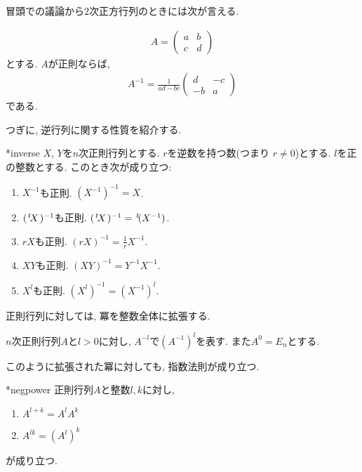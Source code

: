 冒頭での議論から$2$次正方行列のときには次が言える.
\begin{theorem}
  \begin{align*}
    A=
  \begin{pmatrix}
    a&b\\c&d
  \end{pmatrix}
  \end{align*}
  とする.  $A$が正則ならば,
  \begin{align*}
    A^{-1}=
    \frac{1}{ad-bc}
    \begin{pmatrix}
      d&-c\\-b&a
    \end{pmatrix}
  \end{align*}
  である.
\end{theorem}

つぎに,
逆行列に関する性質を紹介する.
\begin{proposition}
  \provelater**{inverse}
  \label{thm:inverse:operation}
  $X$, $Y$を$n$次正則行列とする.
  $r$を逆数を持つ数(つまり $r\neq 0$)とする.
  $l$を正の整数とする.
  このとき次が成り立つ:
  \begin{enumerate}
  \item{}
    $X^{-1}$も正則. $(X^{-1})^{-1}=X$.
  \item{}
    $({\left.^{t}\!X\right.})^{-1}$も正則. $({\left.^{t}\!X\right.})^{-1}={\left.^{t}\!(X^{-1})\right.}$.
  \item{}
    $rX$も正則. $(rX)^{-1}=\frac{1}{r}X^{-1}$.
  \item{}
    $XY$も正則. $(XY)^{-1}=Y^{-1}X^{-1}$.
  \item{}
    $X^l$も正則. $(X^l)^{-1}=(X^{-1})^l$.
  \end{enumerate}
\end{proposition}


正則行列に対しては,
冪を整数全体に拡張する.
\begin{definition}
  $n$次正則行列$A$と$l>0$に対し,
  $A^{-l}$で$(A^{-1})^l$を表す.
  また$A^{0}=E_n$とする.
\end{definition}
このように拡張された冪に対しても,
指数法則が成り立つ.
\begin{prop}
  \provelater**{negpower}
  正則行列$A$と整数$l,k$に対し,
  \begin{enumerate}
  \item{}
    $A^{l+k}=A^lA^k$
  \item{}
    $A^{lk}=(A^l)^k$
  \end{enumerate}
が成り立つ.
\end{prop}

